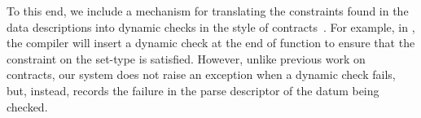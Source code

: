 To this end, we include a mechanism for translating the constraints
found in the data descriptions into dynamic checks in the style of
contracts~\cite{contracts}. For example, in
, the compiler will insert a dynamic check
at the end of function  to ensure that the constraint
on the set-type is satisfied. However, unlike previous work on
contracts, our system does not raise an exception when a dynamic check
fails, but, instead, records the failure in the parse descriptor of
the datum being checked.  


